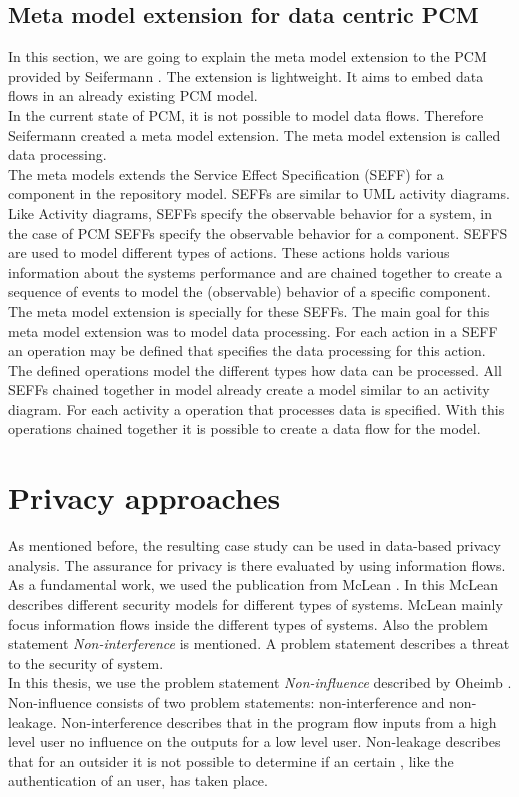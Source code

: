 \subsection{Meta model extension for data centric PCM}
\label{MMext}
In this section, we are going to explain the meta model extension to the PCM provided by Seifermann \cite{MMextension}. The extension is lightweight. It aims to embed data flows in an already existing PCM model.\\ 
In the current state of PCM, it is not possible to model data flows. Therefore Seifermann created a meta model extension. The meta model extension is called data processing. \\
The meta models extends the Service Effect Specification (SEFF) for a component in the repository model. SEFFs are similar to UML activity diagrams. Like Activity diagrams, SEFFs specify the observable behavior for a system, in the case of PCM SEFFs specify the observable behavior for a component. SEFFS are used to model different types of actions. These actions holds various information about the systems performance and are chained together to create a sequence of events to model the (observable) behavior of a specific component.\\ The meta model extension is specially for these SEFFs. The main goal for this meta model extension was to model data processing.  For each action in a SEFF an operation may be defined that specifies the data processing for this action. The defined operations model the different types how data can be processed. All SEFFs chained together in model already create a model similar to an activity diagram. For each activity a operation that processes data is specified. With this operations chained together it is possible to create a data flow for the model. 
\section{Privacy approaches}
As mentioned before, the resulting case study can be used in data-based privacy analysis. The assurance for privacy is there evaluated by using information flows. As a fundamental work, we used the publication from McLean \cite{McLean90}.
In this McLean describes different security models for different types of systems. McLean mainly focus information flows inside the different types of systems. Also the problem statement \textit{Non-interference} is mentioned. A problem statement describes a threat to the security of system.\\
In this thesis, we use the problem statement \textit{Non-influence} described by Oheimb \cite{Noninfluence}. Non-influence consists of two problem statements: non-interference and non-leakage. Non-interference describes that in the program flow inputs from a high level user no influence on the outputs for a low level user. Non-leakage describes that for an outsider it is not possible to determine if an certain , like the authentication of an user, has taken place.
